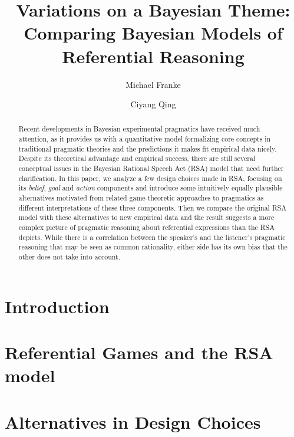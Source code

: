 \documentclass{llncs}
\title{Variations on a Bayesian Theme: Comparing Bayesian Models of Referential Reasoning}
\author{Michael Franke \and Ciyang Qing}
\institute{Institute for Logic, Language and Computation}
\begin{document}
\maketitle

\begin{abstract}
Recent developments in Bayesian experimental pragmatics have received much attention, as it provides us with a quantitative model formalizing core concepts in traditional pragmatic theories and the predictions it makes fit empirical data nicely. Despite its theoretical advantage and empirical success, there are still several conceptual issues in the Bayesian Rational Speech Act (RSA) model that need further clarification. In this paper, we analyze a few design choices made in RSA, focusing on its \emph{belief}, \emph{goal} and \emph{action} components and introduce some intuitively equally plausible alternatives motivated from related game-theoretic approaches to pragmatics as different interpretations of these three components. Then we compare the original RSA model with these alternatives to new empirical data and the result suggests a more complex picture of pragmatic reasoning about referential expressions than the RSA depicts. While there is a correlation between the speaker's and the listener's pragmatic reasoning that may be seen as common rationality, either side has its own bias that the other does not take into account.
\end{abstract}

\section{Introduction}




\section{Referential Games and the RSA model}




\section{Alternatives in Design Choices}


\end{document}
